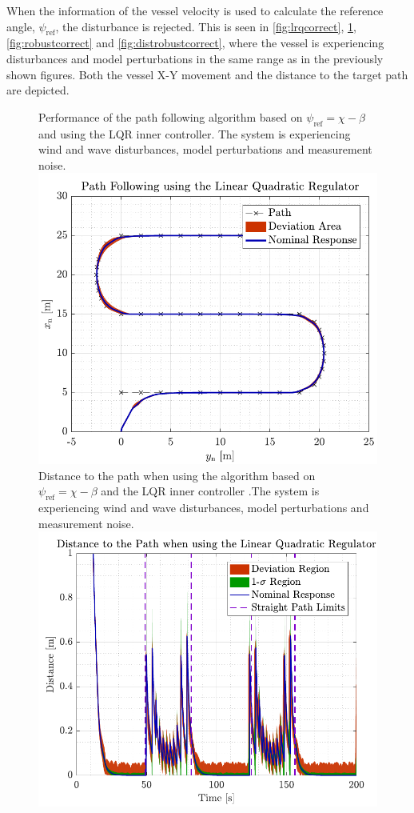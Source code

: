When the information of the vessel velocity is used to calculate the reference angle, $\psi_\mathrm{ref}$, the disturbance is rejected. This is seen in \autoref{fig:lrqcorrect}, \ref{fig:distlqr}, \ref{fig:robustcorrect} and \ref{fig:distrobustcorrect}, where the vessel is experiencing disturbances and model perturbations in the same range as in the previously shown figures. Both the vessel X-Y movement and the distance to the target path are depicted. 

\begin{figure}[H]
	\captionbox  %
	{               %
		Performance of the path following algorithm based on $\psi_\mathrm{ref}=\chi-\beta$ and using the LQR inner controller. The system is experiencing wind and wave disturbances, model perturbations and measurement noise.                %
		\label{fig:lrqcorrect}                                  %
	}                                                                 %
	{                                                                  %
		\includegraphics[width=.45\textwidth]{figures/path_lqr}         %
	}                                                                    %
	\hspace{5pt}                                                          %
	\captionbox  %
	{       
			Distance to the path when using the algorithm based on $\psi_\mathrm{ref}=\chi-\beta$ and the LQR inner controller .The system is experiencing wind and wave disturbances, model perturbations and measurement noise.                                                                  %
		\label{fig:distlqr}                                     %
	}                                                                           %
	{                                                                            %
		\includegraphics[width=.45\textwidth]{figures/dist_lqr}            %
	}                                                                             %
\end{figure}
